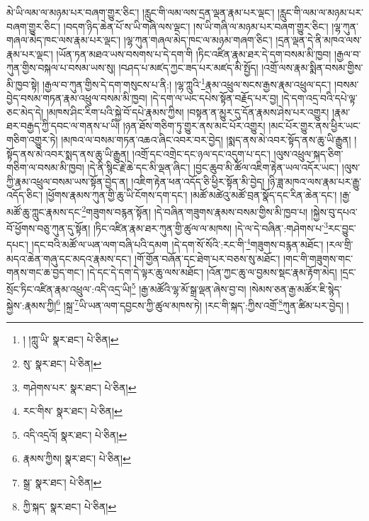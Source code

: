 མེ་ཡི་ལམ་ལ་མཉམ་པར་བཞག་གྱུར་ཅིང་། །རླུང་གི་ལམ་ལས་དྲན་ལྡན་རྣམ་པར་ལྡང་། །རླུང་གི་ལམ་ལ་མཉམ་པར་བཞག་གྱུར་ཅིང་། །བདག་ཉིད་ཆེན་པོ་ས་ཡི་གཞི་ལས་ལྡང་། །ས་ཡི་གཞི་ལ་མཉམ་པར་བཞག་གྱུར་ཅིང་། །ལྷ་ཀུན་གཞལ་མེད་ཁང་ལས་རྣམ་པར་ལྡང་། །ལྷ་ཀུན་གཞལ་མེད་ཁང་ལ་མཉམ་གཞག་ཅིང་། །དྲན་ལྡན་དེ་ནི་མཁའ་ལས་རྣམ་པར་ལྡང་། །ཡོན་ཏན་མཐའ་ཡས་བསགས་པ་དེ་དག་གི །ཏིང་འཛིན་རྣམ་ཐར་དེ་དག་བསམ་མི་ཁྱབ། །རྒྱལ་བ་ཀུན་གྱིས་བསྐལ་པ་བསམ་ཡས་སུ། །བཤད་པ་མཛད་ཀྱང་ཟད་པར་མཛད་མི་སྤྱོད། །འགྲོ་ལས་རྣམ་སྨིན་བསམ་གྱིས་མི་ཁྱབ་སྟེ། །རྒྱལ་བ་ཀུན་གྱིས་དེ་དག་གསུངས་པ་ནི:། །ལྷ་ཀླུའི་\footnote{། །ཀླུ་ཡི་  སྣར་ཐང་།  པེ་ཅིན། }རྣམ་འཕྲུལ་སངས་རྒྱས་རྣམ་འཕྲུལ་དང་། །བསམ་བྱེད་བསམ་གཏན་རྣམ་འཕྲུལ་བསམ་མི་ཁྱབ། །དེ་དག་ལ་ཡང་དཔེས་སྟོན་བརྗོད་པར་བྱ། །དེ་དག་འདྲ་བའི་དཔེ་ལྟ་ཅང་མེད་དེ། །མཁས་ཤིང་རིག་པའི་སྐྱེ་བོ་དཔེ་རྣམས་ཀྱིས། །བསྟན་ན་མྱུར་དུ་དོན་རྣམས་ཤེས་པར་འགྱུར། །རྣམ་ཐར་བརྒྱད་ཀྱི་དབང་ལ་གནས་པ་ཡི། །ཉན་ཐོས་གཅིག་ཏུ་གྱུར་ནས་མང་པོར་འགྱུར། །མང་པོར་གྱུར་ནས་ཕྱིར་ཡང་གཅིག་འགྱུར་ཏེ། །མཁའ་ལ་བསམ་གཏན་འཆའ་ཞིང་འབར་བར་བྱེད། །སྨད་ནས་མེ་འབར་སྟོད་ནས་ཆུ་ཡི་རྒྱུན། །སྟོད་ནས་མེ་འབར་སྨད་ནས་ཆུ་ཡི་རྒྱུན། །འགྲོ་དང་འགྲེང་དང་ཉལ་དང་འདུག་པ་དང་། །ལུས་འཕྲུལ་སྐད་ཅིག་གཅིག་ལ་བསམ་མི་ཁྱབ། །དེ་ནི་སྙིང་རྗེ་ཆེ་དང་མི་ལྡན་ཞིང་། །བྱང་ཆུབ་མི་ཚོལ་འཇིག་རྟེན་ཡལ་འདོར་ཡང་། །ལུས་ཀྱི་རྣམ་འཕྲུལ་བསམ་ཡས་སྟོན་བྱེད་ན། །འཇིག་རྟེན་ཕན་འདོད་ཅི་ཕྱིར་སྟོན་མི་བྱེད། །ཉི་ཟླ་མཁའ་ལས་རྣམ་པར་རྒྱུ་འདོད་ཅིང་། །ཕྱོགས་རྣམས་ཀུན་གྱི་ཆུ་ཡི་ངོགས་དག་དང་། །མཚོ་མཚེའུ་མཚོ་བྲན་སྣོད་དང་རིན་ཆེན་དང་། །རྒྱ་མཚོ་ཆུ་ཀླུང་རྣམས་དང་\footnote{སུ་  སྣར་ཐང་།  པེ་ཅིན། }གཟུགས་བརྙན་སྟོན། །དེ་བཞིན་གཟུགས་རྣམས་བསམ་གྱིས་མི་ཁྱབ་པ། །སྐྱེས་བུ་དཔའ་བོ་ཕྱོགས་བཅུ་ཀུན་དུ་སྟོན། །ཏིང་འཛིན་རྣམ་ཐར་ཀུན་གྱི་ཚུལ་ལ་མཁས། །དེ་ལ་དེ་བཞིན་:གཤེགས་པ་\footnote{གཤེགས་པར་  སྣར་ཐང་།  པེ་ཅིན། }རང་བྱུང་དཔང་། །དང་བའི་མཚོ་ལ་ཡན་ལག་བཞི་པའི་དམག །དེ་དག་སོ་སོའི་:རང་གི་\footnote{རང་གིས་  སྣར་ཐང་།  པེ་ཅིན། }གཟུགས་བརྙན་མཐོང་། །རལ་གྲི་མདའ་ཆེན་གཞུ་དང་མདའ་རྣམས་དང་། །གོ་གྱོན་བཞོན་དང་ཐེག་པར་བཅས་སུ་མཐོང་། །གང་གི་གཟུགས་གང་གནས་གང་ཆ་བྱད་གང་། །དེ་དང་དེ་དག་དེ་ལྟར་ཆུ་ལས་མཐོང་། །འོན་ཀྱང་ཆུ་ལ་བྱམས་སྡང་རྣམ་རྟོག་མེད། །དྲང་སྲོང་ཏིང་འཛིན་རྣམ་འཕྲུལ་:འདི་འདྲ་ཡི།\footnote{འདི་འདྲའོ།  སྣར་ཐང་།  པེ་ཅིན། } །རྒྱ་མཚོའི་ལྷ་མོ་སྒྲ་ལྡན་ཞེས་བྱ་བ། །སེམས་ཅན་རྒྱ་མཚོར་ཇི་སྙེད་སྐྱེས་:རྣམས་ཀྱི།\footnote{རྣམས་ཀྱིས།  སྣར་ཐང་།  པེ་ཅིན། } །སྐྲ་\footnote{སྒྲ་  སྣར་ཐང་།  པེ་ཅིན། }ཡི་ཡན་ལག་དབྱངས་ཀྱི་ཚུལ་མཁས་ཏེ། །རང་གི་སྐད་:ཀྱིས་འགྲོ་\footnote{ཀྱི་སྐད་  སྣར་ཐང་།  པེ་ཅིན། }ཀུན་ཚིམ་པར་བྱེད། །
